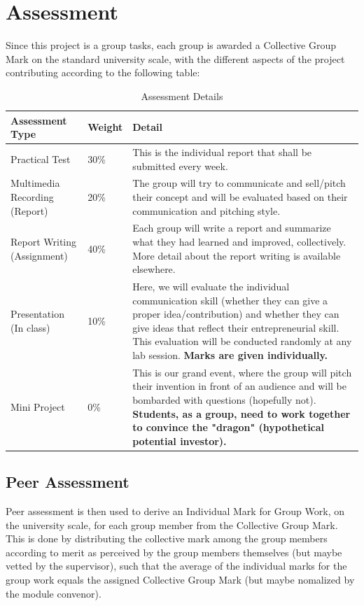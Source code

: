 

\section{Assessment}
Since this project is a group tasks, each group is awarded a Collective Group Mark on the standard university scale, with the different aspects of the project contributing according to the following table:


\begin{table}[h!]
    \centering
    \footnotesize
    \renewcommand{\arraystretch}{1.2} %
    \caption{Assessment Details}
    \begin{tabular}{p{4cm} p{2cm} p{8cm}} %
    \hline
    \textbf{Assessment Type} & \textbf{Weight} & \textbf{Detail} \\ \hline
    Practical Test & 30\% & This is the individual report that shall be submitted every week. \\
    Multimedia Recording (Report) & 20\% & The group will try to communicate and sell/pitch their concept and will be evaluated based on their communication and pitching style. \\
    Report Writing (Assignment) & 40\% & Each group will write a report and summarize what they had learned and improved, collectively. More detail about the report writing is available elsewhere. \\
    Presentation (In class) & 10\% & Here, we will evaluate the individual communication skill (whether they can give a proper idea/contribution) and whether they can give ideas that reflect their entrepreneurial skill. \newline This evaluation will be conducted randomly at any lab session. \newline \textbf{Marks are given individually.} \\
    Mini Project & 0\% & This is our grand event, where the group will pitch their invention in front of an audience and will be bombarded with questions (hopefully not). \newline \textbf{Students, as a group, need to work together to convince the "dragon" (hypothetical potential investor).} \\
    \hline
    \end{tabular}
    \label{tab:assessment}
\end{table}



\subsection{Peer Assessment}
Peer assessment is then used to derive an Individual Mark for Group Work, on the university scale, for each group member from the Collective Group Mark. This is done by distributing the collective mark among the group members according to merit as perceived by the group members themselves (but maybe vetted by the supervisor), such that the average of the individual marks for the group work equals the assigned Collective Group Mark (but maybe nomalized by the module convenor).

